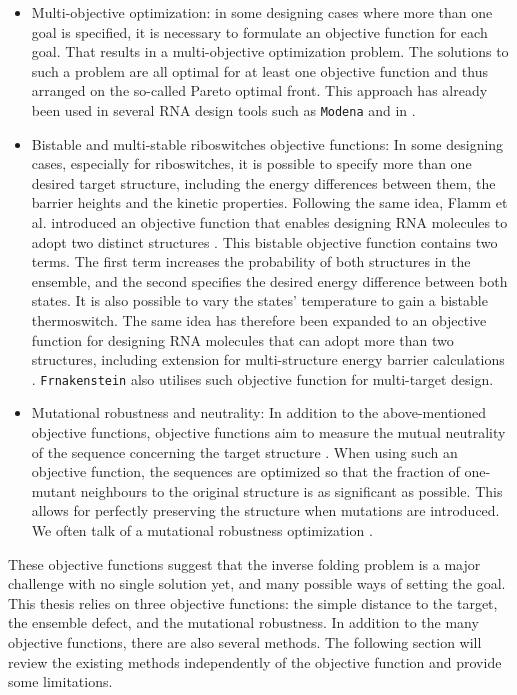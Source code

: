 \begin{itemize}
	\item Multi-objective optimization: in some designing cases where more than one goal is specified, it is necessary to formulate an objective function for each goal. That results in a multi-objective optimization problem. The solutions to such a problem are all optimal for at least one objective function and thus arranged on the so-called Pareto optimal front. This approach has already been used in several \ac{RNA} design tools such as \texttt{Modena} \cite{modena_2012, taneda2015multi} and in \cite{ramlan2011design}.
	
	\item Bistable and multi-stable riboswitches objective functions: In some designing cases, especially for riboswitches, it is possible to specify more than one desired target structure, including the energy differences between them, the barrier heights and the kinetic properties. Following the same idea, Flamm et al. introduced an objective function that enables designing \ac{RNA} molecules to adopt two distinct structures \cite{flamm2001design}. This bistable objective function contains two terms. The first term increases the probability of both structures in the ensemble, and the second specifies the desired energy difference between both states. It is also possible to vary the states' temperature to gain a bistable thermoswitch. The same idea has therefore been expanded to an objective function for designing \ac{RNA} molecules that can adopt more than two structures, including extension for multi-structure energy barrier calculations \cite{ramlan2011design, shu2010ardesigner}.  \texttt{Frnakenstein} \cite{lyngso2012frnakenstein} also utilises such objective function for multi-target design.
	
	\item Mutational robustness and neutrality: In addition to the above-mentioned objective functions, objective functions aim to measure the mutual neutrality of the sequence concerning the target structure \cite{shu2010ardesigner}. When using such an objective function, the sequences are optimized so that the fraction of one-mutant neighbours to the original structure is as significant as possible. This allows for perfectly preserving the structure when mutations are introduced. We often talk of a mutational robustness optimization \cite{avihoo2011rnaexinv}.
\end{itemize}

These objective functions suggest that the inverse folding problem is a major challenge with no single solution yet, and many possible ways of setting the goal. This thesis relies on three objective functions: the simple distance to the target, the ensemble defect, and the mutational robustness. In addition to the many objective functions, there are also several methods. The following section will review the existing methods independently of the objective function and provide some limitations.

